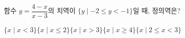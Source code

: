 \hspace*{2mm}\begin{minipage}[t]{\dimexpr\linewidth-2mm\relax}\vspace{0pt}
함수 $y=\dfrac{4-x}{x-3}$의 치역이 $\{y \mid -2\le y<-1\}$일 때, 정의역은?
\begin{choicesii}{$\{x \mid x<3\}$}{$\{x \mid x\le 2\}$}{$\{x \mid x>3\}$}{$\{x \mid x\ge 4\}$}{$\{x \mid 2\le x<3\}$}\end{choicesii}\end{minipage}
